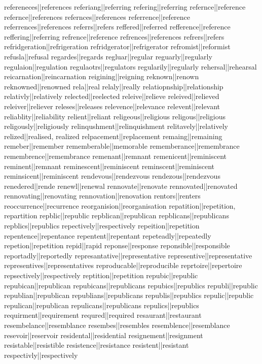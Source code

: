 refereneces||references
referiang||referring
refering||referring
refernce||reference
refernce||references
refernces||references
referrence||reference
referrences||references
referrs||refers
reffered||referred
refference||reference
reffering||referring
refrence||reference
refrences||references
refrers||refers
refridgeration||refrigeration
refridgerator||refrigerator
refromist||reformist
refusla||refusal
regardes||regards
regluar||regular
reguarly||regularly
regulaion||regulation
regulaotrs||regulators
regularily||regularly
rehersal||rehearsal
reicarnation||reincarnation
reigining||reigning
reknown||renown
reknowned||renowned
rela||real
relaly||really
relatiopnship||relationship
relativly||relatively
relected||reelected
releive||relieve
releived||relieved
releiver||reliever
releses||releases
relevence||relevance
relevent||relevant
reliablity||reliability
relient||reliant
religeous||religious
religous||religious
religously||religiously
relinqushment||relinquishment
relitavely||relatively
relized||realised, realized
relpacement||replacement
remaing||remaining
remeber||remember
rememberable||memorable
rememberance||remembrance
remembrence||remembrance
remenant||remnant
remenicent||reminiscent
reminent||remnant
reminescent||reminiscent
reminscent||reminiscent
reminsicent||reminiscent
rendevous||rendezvous
rendezous||rendezvous
renedered||rende
renewl||renewal
rennovate||renovate
rennovated||renovated
rennovating||renovating
rennovation||renovation
rentors||renters
reoccurrence||recurrence
reorganision||reorganisation
repatition||repetition, repartition
repblic||republic
repblican||republican
repblicans||republicans
repblics||republics
repectively||respectively
repeition||repetition
repentence||repentance
repentent||repentant
repeteadly||repeatedly
repetion||repetition
repid||rapid
reponse||response
reponsible||responsible
reportadly||reportedly
represantative||representative
representive||representative
representives||representatives
reproducable||reproducible
reprtoire||repertoire
repsectively||respectively
reptition||repetition
repubic||republic
repubican||republican
repubicans||republicans
repubics||republics
republi||republic
republian||republican
republians||republicans
republis||republics
repulic||republic
repulican||republican
repulicans||republicans
repulics||republics
requirment||requirement
requred||required
resaurant||restaurant
resembelance||resemblance
resembes||resembles
resemblence||resemblance
resevoir||reservoir
residental||residential
resignement||resignment
resistable||resistible
resistence||resistance
resistent||resistant
respectivly||respectively
